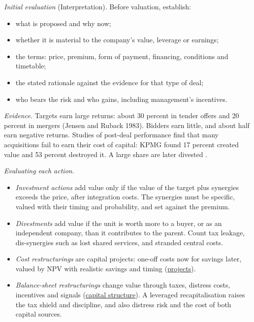 \begin{qfmethod}
\emph{Initial evaluation} (Interpretation). Before valuation, establish:
\begin{itemize}
\item what is proposed and why now;
\item whether it is material to the company's value, leverage or earnings;
\item the terms: price, premium, form of payment, financing, conditions and timetable;
\item the stated rationale against the evidence for that type of deal;
\item who bears the risk and who gains, including management's incentives.
\end{itemize}

\emph{Evidence.} Targets earn large returns: about 30 percent in tender offers and 20 percent in mergers (Jensen and Ruback 1983). Bidders earn little, and about half earn negative returns. Studies of post-deal performance find that many acquisitions fail to earn their cost of capital: KPMG found 17 percent created value and 53 percent destroyed it. A large share are later divested \citep[pp.~704--705, 723--724]{investment-valuation-2012}.

\emph{Evaluating each action.}
\begin{itemize}
\item \emph{Investment actions} add value only if the value of the target plus synergies exceeds the price, after integration costs. The synergies must be specific, valued with their timing and probability, and set against the premium.
\item \emph{Divestments} add value if the unit is worth more to a buyer, or as an independent company, than it contributes to the parent. Count tax leakage, dis-synergies such as lost shared services, and stranded central costs.
\item \emph{Cost restructurings} are capital projects: one-off costs now for savings later, valued by NPV with realistic savings and timing (\hyperref[meth:capital-project-evaluation]{projects}).
\item \emph{Balance-sheet restructurings} change value through taxes, distress costs, incentives and signals (\hyperref[mod:capital-structure-theory]{capital structure}). A leveraged recapitalisation raises the tax shield and discipline, and also distress risk and the cost of both capital sources.
\end{itemize}


\end{qfmethod}
